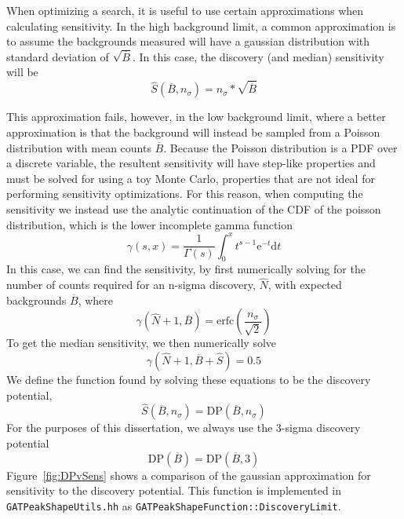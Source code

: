 \documentclass[notitlepage,rmp,aps,10pt]{revtex4-1}
\begin{document}
When optimizing a search, it is useful to use certain approximations when calculating sensitivity.
In the high background limit, a common approximation is to assume the backgrounds measured will have a gaussian distribution with standard deviation of $\sqrt{\overline{B}}$.
In this case, the discovery (and median) sensitivity will be
\begin{equation}
  \hat{S}(\overline{B}, n_\sigma)=n_\sigma * \sqrt{\overline{B}}
\end{equation}

This approximation fails, however, in the low background limit, where a better approximation is that the background will instead be sampled from a Poisson distribution with mean counts $\overline{B}$.
Because the Poisson distribution is a PDF over a discrete variable, the resultent sensitivity will have step-like properties and must be solved for using a toy Monte Carlo, properties that are not ideal for performing sensitivity optimizations.
For this reason, when computing the sensitivity we instead use the analytic continuation of the CDF of the poisson distribution, which is the lower incomplete gamma function
\begin{equation}
  \gamma(s, x)=\frac{1}{\Gamma(s)}\int_0^x t^{s-1} \mathrm{e}^{-t} \mathrm{d}t
\end{equation}
In this case, we can find the sensitivity, by first numerically solving for the number of counts required for an n-sigma discovery, $\hat{N}$, with expected backgrounds $\overline{B}$, where
\begin{equation}
  \gamma(\hat{N}+1, \overline{B}) = \mathrm{erfc}(\frac{n_\sigma}{\sqrt{2}})
\end{equation}
To get the median sensitivity, we then numerically solve
\begin{equation}
  \gamma(\hat{N}+1, \overline{B} + \hat{S}) = 0.5
\end{equation}
We define the function found by solving these equations to be the discovery potential\cite{2013CUORE},
\begin{equation}
  \hat{S}(\overline{B}, n_\sigma) = \mathrm{DP}(\overline{B}, n_\sigma)
\end{equation}
For the purposes of this dissertation, we always use the 3-sigma discovery potential
\begin{equation}
  \mathrm{DP}(\overline{B}) = \mathrm{DP}(\overline{B}, 3)
\end{equation}
Figure~\ref{fig:DPvSens} shows a comparison of the gaussian approximation for sensitivity to the discovery potential.
This function is implemented in \texttt{GATPeakShapeUtils.hh} as \linebreak\texttt{GATPeakShapeFunction::DiscoveryLimit}.
\end{document}

